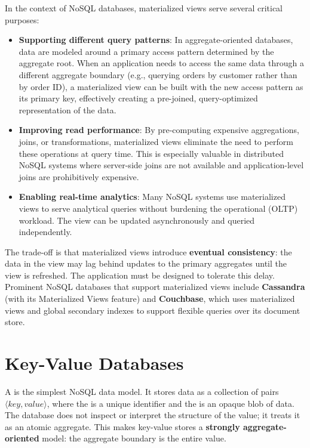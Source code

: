 In the context of NoSQL databases, materialized views serve several critical purposes:
\begin{itemize}
    \item \textbf{Supporting different query patterns}: In aggregate-oriented databases, data are modeled around a primary access pattern determined by the aggregate root. When an application needs to access the same data through a different aggregate boundary (e.g., querying orders by customer rather than by order ID), a materialized view can be built with the new access pattern as its primary key, effectively creating a pre-joined, query-optimized representation of the data.
    \item \textbf{Improving read performance}: By pre-computing expensive aggregations, joins, or transformations, materialized views eliminate the need to perform these operations at query time. This is especially valuable in distributed NoSQL systems where server-side joins are not available and application-level joins are prohibitively expensive.
    \item \textbf{Enabling real-time analytics}: Many NoSQL systems use materialized views to serve analytical queries without burdening the operational (OLTP) workload. The view can be updated asynchronously and queried independently.
\end{itemize}
The trade-off is that materialized views introduce \textbf{eventual consistency}: the data in the view may lag behind updates to the primary aggregates until the view is refreshed. The application must be designed to tolerate this delay. Prominent NoSQL databases that support materialized views include \textbf{Cassandra} (with its Materialized Views feature) and \textbf{Couchbase}, which uses materialized views and global secondary indexes to support flexible queries over its document store.

\section{Key-Value Databases}
A  is the simplest NoSQL data model. It stores data as a collection of pairs $\langle key, value \rangle$, where the  is a unique identifier and the  is an opaque blob of data. The database does not inspect or interpret the structure of the value; it treats it as an atomic aggregate. This makes key-value stores a \textbf{strongly aggregate-oriented} model: the aggregate boundary is the entire value.

